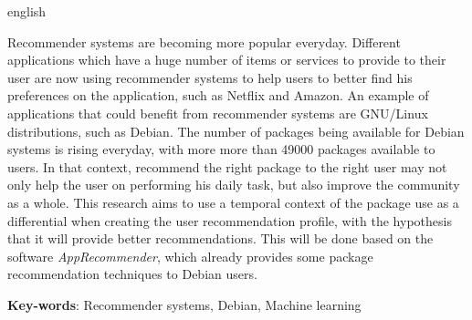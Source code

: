 \begin{resumo}[Abstract]
 \begin{otherlanguage*}{english}

   Recommender systems are becoming more popular everyday. Different
   applications which have a huge number of items or services to provide
   to their user are now using recommender systems to help users to
   better find his preferences on the application, such as Netflix and
   Amazon. An example of applications that could benefit from recommender
   systems are GNU/Linux distributions, such as Debian. The number of
   packages being available for Debian systems is rising
   everyday, with more more than 49000 packages
   available to users. In that context, recommend the right package
   to the right user may not only help the user on
   performing his daily task, but also improve the community as a whole.
   This research aims to use a temporal context of the package use as a
   differential when creating the user recommendation profile, with
   the hypothesis that it will provide better recommendations. This
   will be done based on the software \textit{AppRecommender}, which
   already provides some package recommendation techniques to
   Debian users.

   \vspace{\onelineskip}
 
   \noindent 
   \textbf{Key-words}: Recommender systems, Debian, Machine learning
 \end{otherlanguage*}
\end{resumo}
